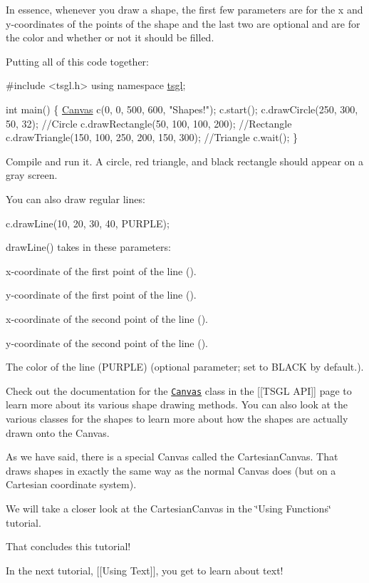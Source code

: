 In essence, whenever you draw a shape, the first few parameters are for the x and y-\/coordinates of the points of the shape and the last two are optional and are for the color and whether or not it should be filled.

Putting all of this code together\+:


\begin{DoxyCode}
\textcolor{preprocessor}{#include <tsgl.h>}
\textcolor{keyword}{using namespace }\hyperlink{namespacetsgl}{tsgl};

\textcolor{keywordtype}{int} main() \{
  \hyperlink{classtsgl_1_1_canvas}{Canvas} c(0, 0, 500, 600, \textcolor{stringliteral}{"Shapes!"});
  c.start();
  c.drawCircle(250, 300, 50, 32);  \textcolor{comment}{//Circle}
  c.drawRectangle(50, 100, 100, 200);  \textcolor{comment}{//Rectangle}
  c.drawTriangle(150, 100, 250, 200, 150, 300);  \textcolor{comment}{//Triangle}
  c.wait();
\}
\end{DoxyCode}


Compile and run it. A circle, red triangle, and black rectangle should appear on a gray screen.

You can also draw regular lines\+:


\begin{DoxyCode}
c.drawLine(10, 20, 30, 40, PURPLE);
\end{DoxyCode}


draw\+Line() takes in these parameters\+:


\begin{DoxyItemize}
\item x-\/coordinate of the first point of the line ({}).
\item y-\/coordinate of the first point of the line ({}).
\item x-\/coordinate of the second point of the line ({}).
\item y-\/coordinate of the second point of the line ({}).
\item The color of the line ({\ttfamily P\+U\+R\+P\+L\+E}) (optional parameter; set to {\ttfamily B\+L\+A\+C\+K} by default.).
\end{DoxyItemize}

Check out the documentation for the \href{http://calvin-cs.github.io/TSGL/html/_canvas_8h_source.html}{\tt Canvas} class in the \mbox{[}\mbox{[}T\+S\+G\+L A\+P\+I\mbox{]}\mbox{]} page to learn more about its various shape drawing methods. You can also look at the various classes for the shapes to learn more about how the shapes are actually drawn onto the Canvas.

As we have said, there is a special Canvas called the Cartesian\+Canvas. That draws shapes in exactly the same way as the normal Canvas does (but on a Cartesian coordinate system).

We will take a closer look at the Cartesian\+Canvas in the \char`\"{}\+Using Functions\char`\"{} tutorial.

That concludes this tutorial!

In the next tutorial, \mbox{[}\mbox{[}Using Text\mbox{]}\mbox{]}, you get to learn about text! 